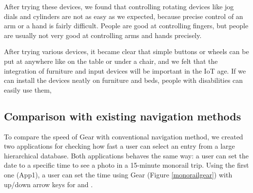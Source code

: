 \documentclass[conference]{IEEEtran}
\def\up{\tsf{▲}}
\def\down{\tsf{▼}}
\begin{document}
After trying these devices, we found that controlling rotating devices
like jog dials and cylinders are not as easy as we expected,
because precise control of an arm or a hand is fairly difficult.
People are good at controlling fingers, but people are usually not very good at
controlling arms and hands precisely.



After trying various devices, it became clear that simple buttons or
wheels can be put at anywhere like on the table or under a chair, and
we felt that the integration of furniture and input devices will be
important in the IoT age.
%
If we can install the devices neatly on furniture and beds, people with disabilities can easily use them, 

\subsection{Comparison with existing navigation methods}

To compare the speed of Gear with conventional navigation method,
we created two applications for checking how fast a user can select an entry
from a large hierarchical database.
%
Both applications behaves the same way:
a user can set the date to a specific time to see a photo in a 15-minute monorail trip.
%
Using the first one (App1), a user can set the time using Gear (Figure \ref{monorailgear})
with up/down arrow keys for {\up} and {\down}.
\end{document}
